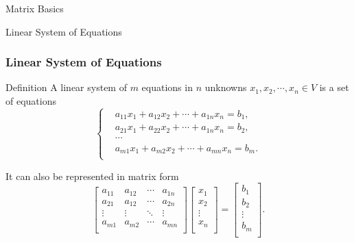 \documentclass{beamer}
\begin{document}
\begin{section}{Matrix Basics}
\begin{frame}[label=1]{Linear System of Equations}
    \frametitle{Linear System of Equations}
    \begin{block}{Definition}
        A {linear system} of $m$ equations in $n$ unknowns $x_1,x_2,\cdots,x_n \in V$ is a set of equations 
        \begin{equation*}
            \left\{ 
                \begin{aligned}
                    & a_{11}x_{1} + a_{12}x_{2} + \cdots + a_{1 n}x_n = b_1, \\
                    & a_{21}x_{1} + a_{22}x_{2} + \cdots + a_{1 n}x_n = b_2, \\
                    & \cdots \\
                    & a_{m1}x_{1} + a_{m2}x_{2} + \cdots + a_{m n}x_n = b_m. \\
                \end{aligned}
            \right.
        \end{equation*}
        \par It can also be represented in matrix form 
        \begin{equation*}
            \left[ 
                \begin{array}{cccc}
                    a_{11} & a_{12} & \cdots & a_{1n} \\ 
                    a_{21} & a_{12} & \cdots & a_{2n} \\ 
                    \vdots & \vdots & \ddots & \vdots \\ 
                    a_{m1} & a_{m2} & \cdots & a_{mn} \\
                \end{array}
            \right] \left[
                \begin{array}{c} 
                    x_{1} \\
                    x_{2} \\
                    \vdots \\
                    x_{n} \\ 
                \end{array}
            \right] = \left[ 
                \begin{array}{c} 
                    b_{1} \\
                    b_{2} \\
                    \vdots \\
                    b_{m} \\
                \end{array}
            \right].
        \end{equation*}
    \end{block}
\end{frame}


\end{section}
\end{document}
